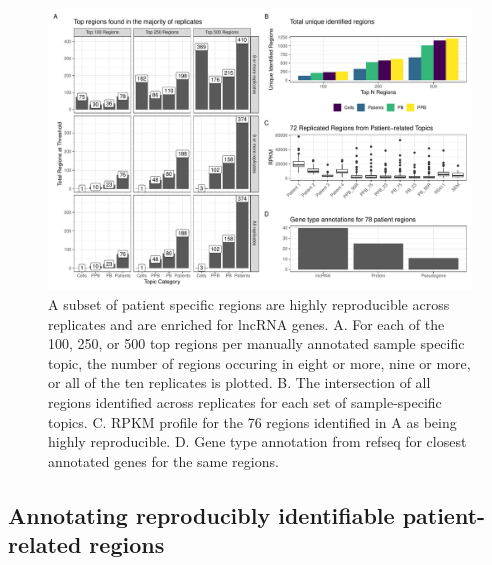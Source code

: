 \begin{figure}
    \centering
    \includegraphics[width=\textwidth]{plot/ch5/mll_top_regions_bigwig.pdf}
    \caption[A subset of patient specific regions are highly reproducible across replicates and are enriched for lncRNA genes.]{A subset of patient specific regions are highly reproducible across replicates and are enriched for lncRNA genes. A. For each of the 100, 250, or 500 top regions per manually annotated sample specific topic, the number of regions occuring in eight or more, nine or more, or all of the ten replicates is plotted. B. The intersection of all regions identified across replicates for each set of sample-specific topics. C. RPKM profile for the 76 regions identified in A as being highly reproducible. D. Gene type annotation from refseq for closest annotated genes for the same regions.}
    \label{fig:mll_region_repro}
\end{figure}

\subsection{Annotating reproducibly identifiable patient-related regions}

